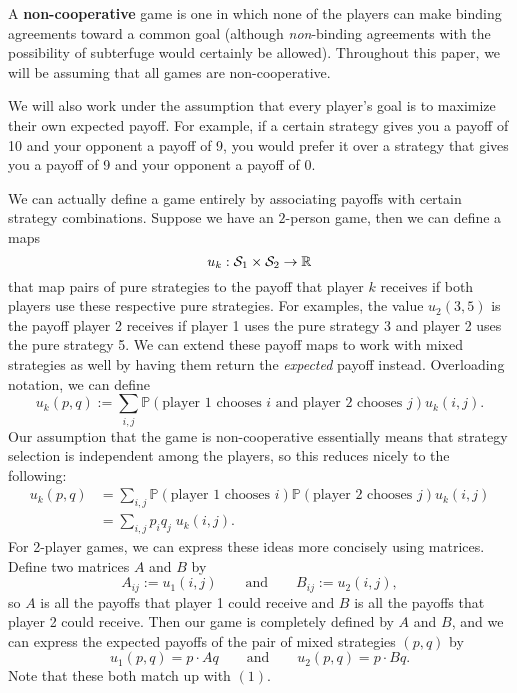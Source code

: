 \documentclass[twoside,10pt]{article}
\begin{document}
A \textbf{non-cooperative} game is one in which none of the players can make binding agreements toward a common goal (although \textit{non}-binding agreements with the possibility of subterfuge would certainly be allowed). Throughout this paper, we will be assuming that all games are non-cooperative.

We will also work under the assumption that every player's goal is to maximize their own expected payoff. For example, if a certain strategy gives you a payoff of 10 and your opponent a payoff of 9, you would prefer it over a strategy that gives you a payoff of 9 and your opponent a payoff of 0.

We can actually define a game entirely by associating payoffs with certain strategy combinations. Suppose we have an $2$-person game, then we can define a maps
\[
	u_k: \mathcal{S}_{1}\times \mathcal{S}_{2} \to \mathbb{R}
\]
that map pairs of pure strategies to the payoff that player $k$ receives if both players use these respective pure strategies. For examples, the value $u_2(3, 5)$ is the payoff player 2 receives if player 1 uses the pure strategy 3 and player 2 uses the pure strategy 5. We can extend these payoff maps to work with mixed strategies as well by having them return the \textit{expected} payoff instead. Overloading notation, we can define
\[
	u_{k}(p,q) := \sum_{i,j} \mathbb{P}\left( \text{player 1 chooses } i \text{ and player 2 chooses } j \right) u_{k}(i,j).
\] 
Our assumption that the game is non-cooperative essentially means that strategy selection is independent among the players, so this reduces nicely to the following:
\begin{align}
u_{k}(p,q) &= \sum_{i,j} \mathbb{P}\left( \text{player 1 chooses } i\right) \mathbb{P}\left( \text{player 2 chooses } j \right) u_{k}(i,j) \nonumber\\
	   &= \sum_{i, j} p_i q_j \; u_k(i, j).
\end{align}
For 2-player games, we can express these ideas more concisely using matrices. Define two matrices $A$ and $B$ by
\[
	A_{ij} := u_1(i,j) \qquad\text{and}\qquad B_{ij} := u_2(i,j),
\] so $A$ is all the payoffs that player 1 could receive and $B$ is all the payoffs that player 2 could receive. Then our game is completely defined by $A$ and $B$, and we can express the expected payoffs of the pair of mixed strategies $(p,q)$ by
\begin{equation}
	u_1(p,q) = p \cdot Aq \qquad\text{and}\qquad u_2(p,q) = p \cdot Bq.
\end{equation}
Note that these both match up with $(1)$.
\end{document}
